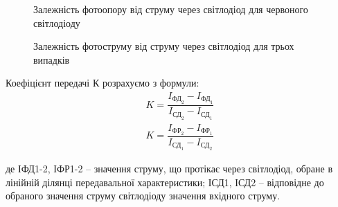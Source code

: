 \documentclass[a4paper,14pt]{extreport}
\begin{document}
 
\begin{figure}[h!]
\caption{Залежність фотоопору від струму через світлодіод для
червоного світлодіоду}
\end{figure}


\begin{figure}[h!]
\caption{Залежність фотоструму від струму через світлодіод для
трьох випадків}
\end{figure}

Коефіцієнт передачі К розрахуємо з формули:\\ 

\begin{equation}
\begin{array}{r}
K=\dfrac{I_{\text{ФД}_{2}}-I_{\text{ФД}_{1}}}{I_{\text{СД}_{2}}-I_{\text{СД}_{1}}} \\
K=\dfrac{I_{\text{ФР}_{2}}-I_{\text{ФР}_{1}}}{I_{\text{СД}_{1}}-I_{\text{СД}_{2}}}
\end{array}
\end{equation}

де ІФД1-2, ІФР1-2 – значення струму, що протікає через світлодіод, обране в лінійній
ділянці передавальної характеристики; ІСД1, ІСД2 – відповідне до обраного
значення струму світлодіоду значення вхідного струму.\\[2cm]
\end{document}
